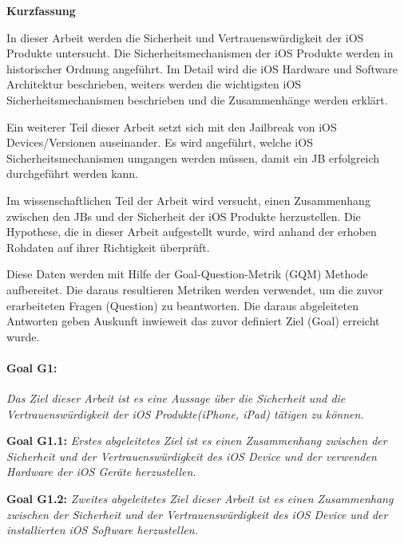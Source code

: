 %
%
% 
% 
% 



\cleardoublepage

\begin{center}
{\Large\bfseries Kurzfassung}
\end{center}
In dieser Arbeit werden die Sicherheit und Vertrauenswürdigkeit der iOS Produkte untersucht. Die Sicherheitsmechanismen der iOS Produkte werden in historischer Ordnung angeführt. Im Detail wird die iOS Hardware und Software Architektur beschrieben, weiters werden die wichtigsten iOS Sicherheitsmechanismen beschrieben und die Zusammenhänge werden erklärt. \par 
Ein weiterer Teil dieser Arbeit setzt sich mit den Jailbreak von iOS Devices/Versionen auseinander. Es wird angeführt, welche iOS Sicherheitsmechanismen umgangen werden müssen, damit ein JB erfolgreich durchgeführt werden kann. \par 
Im wissenschaftlichen Teil der Arbeit wird versucht, einen Zusammenhang zwischen den JBs und der Sicherheit der iOS Produkte herzustellen. Die Hypothese, die in dieser Arbeit aufgestellt wurde, wird anhand der erhoben Rohdaten auf ihrer Richtigkeit überprüft. \par
Diese Daten werden mit Hilfe der Goal-Question-Metrik (GQM) Methode aufbereitet. Die daraus resultieren Metriken werden verwendet, um die zuvor erarbeiteten Fragen (Question) zu beantworten. Die daraus abgeleiteten Antworten geben Auskunft inwieweit das zuvor definiert Ziel (Goal) erreicht wurde.\par 

\paragraph{Goal G1:}\textit{\glqq Das Ziel dieser Arbeit ist es eine Aussage über die Sicherheit und die Vertrauenswürdigkeit der iOS Produkte(iPhone, iPad) tätigen zu können.\grqq{}} \par
\textbf{Goal G1.1:} \textit{\glqq Erstes abgeleitetes Ziel ist es einen Zusammenhang zwischen der Sicherheit und der Vertrauenswürdigkeit des iOS Device und der verwenden Hardware der iOS Geräte herzustellen.\grqq{}} \par 
\textbf{Goal G1.2:} \textit{\glqq Zweites abgeleitetes Ziel dieser Arbeit ist es einen Zusammenhang zwischen der Sicherheit und der Vertrauenswürdigkeit des iOS Device und der installierten iOS Software herzustellen.\grqq{}}

